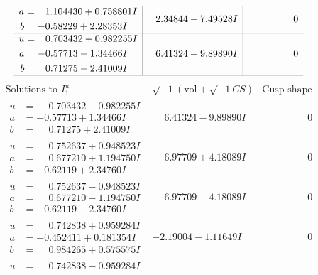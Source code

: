 \documentclass[1p]{elsarticle_modified}
\theoremstyle{definition}
\newcommand{\I}{\sqrt{-1}}
\begin{document}
$$\begin{array}{c|c|c}
\begin{aligned}
a &= \phantom{-}1.104430 + 0.758801 I \\
b &= -0.58229 + 2.28353 I\end{aligned}
 & \phantom{-}2.34844 + 7.49528 I & \phantom{-0.000000 } 0 \\ \hline\begin{aligned}
u &= \phantom{-}0.703432 + 0.982255 I \\
a &= -0.57713 - 1.34466 I \\
b &= \phantom{-}0.71275 - 2.41009 I\end{aligned}
 & \phantom{-}6.41324 + 9.89890 I & \phantom{-0.000000 } 0\\
 \hline 
 \end{array}$$\newpage$$\begin{array}{c|c|c}  
\text{Solutions to }I^u_{1}& \I (\text{vol} + \sqrt{-1}CS) & \text{Cusp shape}\\
 \hline 
\begin{aligned}
u &= \phantom{-}0.703432 - 0.982255 I \\
a &= -0.57713 + 1.34466 I \\
b &= \phantom{-}0.71275 + 2.41009 I\end{aligned}
 & \phantom{-}6.41324 - 9.89890 I & \phantom{-0.000000 } 0 \\ \hline\begin{aligned}
u &= \phantom{-}0.752637 + 0.948523 I \\
a &= \phantom{-}0.677210 + 1.194750 I \\
b &= -0.62119 + 2.34760 I\end{aligned}
 & \phantom{-}6.97709 + 4.18089 I & \phantom{-0.000000 } 0 \\ \hline\begin{aligned}
u &= \phantom{-}0.752637 - 0.948523 I \\
a &= \phantom{-}0.677210 - 1.194750 I \\
b &= -0.62119 - 2.34760 I\end{aligned}
 & \phantom{-}6.97709 - 4.18089 I & \phantom{-0.000000 } 0 \\ \hline\begin{aligned}
u &= \phantom{-}0.742838 + 0.959284 I \\
a &= -0.452411 + 0.181354 I \\
b &= \phantom{-}0.984265 + 0.575575 I\end{aligned}
 & -2.19004 - 1.11649 I & \phantom{-0.000000 } 0 \\ \hline\begin{aligned}
u &= \phantom{-}0.742838 - 0.959284 I \\

\end{aligned}
\end{array}$$
\end{document}
